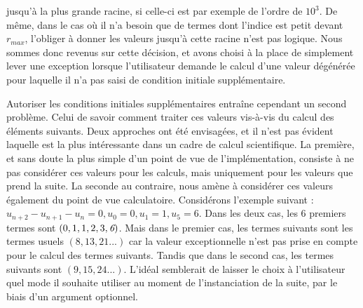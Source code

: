 \documentclass[12pt]{article}
\begin{document}
        jusqu'à la plus grande racine, si celle-ci est par exemple de l'ordre de $10^3$.
        De même, dans le cas où il n'a besoin que de termes dont l'indice est petit devant
        $r_{max}$, l'obliger à donner les valeurs jusqu'à cette racine n'est pas logique.
        Nous sommes donc revenus sur cette décision, et avons choisi à la place de simplement
        lever une exception lorsque l'utilisateur demande le calcul d'une valeur dégénérée
        pour laquelle il n'a pas saisi de condition initiale supplémentaire.
        \par Autoriser les conditions initiales supplémentaires entraîne cependant un second
        problème. Celui de savoir comment traiter ces valeurs vis-à-vis du calcul des
        éléments suivants. Deux approches ont été envisagées, et il n'est pas évident
        laquelle est la plus intéressante dans un cadre de calcul scientifique.
        La première, et sans doute la plus simple d'un point de vue de l'implémentation,
        consiste à ne pas considérer ces valeurs pour les calculs, mais uniquement
        pour les valeurs que prend la suite. La seconde au contraire, nous amène à considérer
        ces valeurs également du point de vue calculatoire. Considérons l'exemple suivant :
        $u_{n+2} - u_{n+1} - u_n = 0, u_0=0, u_1=1, u_5=6$. Dans les deux cas, les 6 premiers
        termes sont $(0,1,1,2,3,\emph{6})$. Mais dans le premier cas, les termes suivants sont
        les termes usuels $(8,13,21...)$ car la valeur exceptionnelle n'est pas prise en
        compte pour le calcul des termes suivants. Tandis que dans le second cas, les termes
        suivants sont $(9,15,24...)$. L'idéal semblerait de laisser le choix à l'utilisateur
        quel mode il souhaite utiliser au moment de l'instanciation de la suite, par le biais
        d'un argument optionnel.
\end{document}
